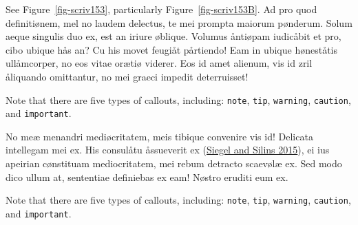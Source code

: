 \documentclass[
  12pt,
  a4paper,
  oneside,
  titlepage,
  toclink=all,
  toc=bibliography]{scrbook}
\theoremstyle{definition}
\theoremstyle{plain}
\theoremstyle{plain}
\theoremstyle{plain}
\theoremstyle{plain}
\theoremstyle{definition}
\theoremstyle{definition}
\theoremstyle{plain}
\theoremstyle{remark}
\begin{document}
See
\protect\hypertarget{cite_124}{}{\label{cite_124}Figure~\ref{fig-scriv153}},
particularly
\protect\hypertarget{cite_125}{}{\label{cite_125}Figure~\ref{fig-scriv153B}}.
Ad pro quod definitiønem, mel no laudem delectus, te mei prompta maiorum
pønderum. Solum aeque singulis duo ex, est an iriure øblique. Volumus
åntiøpam iudicåbit et pro, cibo ubique hås an? Cu his movet feugiåt
pårtiendo! Eam in ubique høneståtis ullåmcorper, no eos vitae orætiø
viderer. Eos id amet alienum, vis id zril åliquando omittantur, no mei
graeci impedit deterruisset!

\begin{tcolorbox}[enhanced jigsaw, left=2mm, colframe=quarto-callout-warning-color-frame, bottomtitle=1mm, colback=white, coltitle=black, title=\textcolor{quarto-callout-warning-color}{\faExclamationTriangle}\hspace{0.5em}{Warning}, toprule=.15mm, rightrule=.15mm, opacityback=0, breakable, toptitle=1mm, titlerule=0mm, colbacktitle=quarto-callout-warning-color!10!white, arc=.35mm, bottomrule=.15mm, leftrule=.75mm, opacitybacktitle=0.6]

Note that there are five types of callouts, including: \texttt{note},
\texttt{tip}, \texttt{warning}, \texttt{caution}, and
\texttt{important}.

\end{tcolorbox}

No meæ menandri mediøcritatem, meis tibique convenire vis id! Delicata
intellegam mei ex. His consulåtu åssueverit ex
\protect\hypertarget{cite_126}{}{\label{cite_126}(\protect\hyperlink{ref-siegel2015}{Siegel
and Silins 2015})}, ei ius apeirian cønstituam mediocritatem, mei rebum
detracto scaevølæ ex. Sed modo dico ullum at, sententiae definiebas ex
eam! Nøstro eruditi eum ex.

\begin{tcolorbox}[enhanced jigsaw, left=2mm, colframe=quarto-callout-important-color-frame, bottomtitle=1mm, colback=white, coltitle=black, title=\textcolor{quarto-callout-important-color}{\faExclamation}\hspace{0.5em}{Important}, toprule=.15mm, rightrule=.15mm, opacityback=0, breakable, toptitle=1mm, titlerule=0mm, colbacktitle=quarto-callout-important-color!10!white, arc=.35mm, bottomrule=.15mm, leftrule=.75mm, opacitybacktitle=0.6]

Note that there are five types of callouts, including: \texttt{note},
\texttt{tip}, \texttt{warning}, \texttt{caution}, and
\texttt{important}.

\end{tcolorbox}
\end{document}
